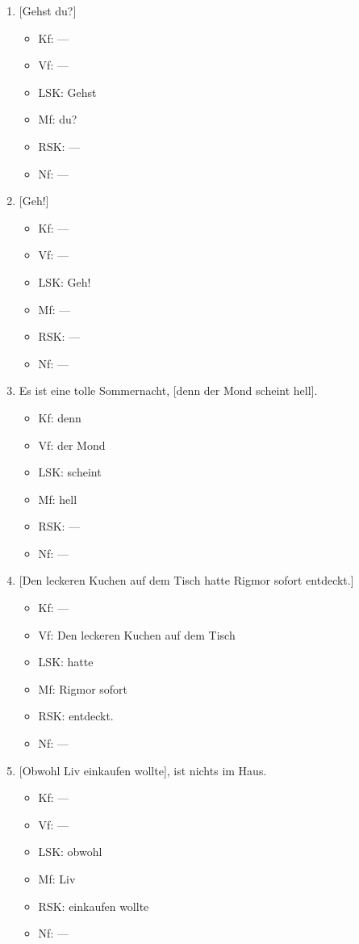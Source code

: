 \begin{enumerate}
\Np

  \item{} [Gehst du?]
    \begin{itemize}
      \item Kf: ---
      \item Vf: ---
      \item LSK: Gehst
      \item Mf: du?
      \item RSK: ---
      \item Nf: ---
    \end{itemize}
  \item{} [Geh!]
    \begin{itemize}
      \item Kf: ---
      \item Vf: ---
      \item LSK: Geh!
      \item Mf: ---
      \item RSK: ---
      \item Nf: ---
    \end{itemize}
  \item Es ist eine tolle Sommernacht, [denn der Mond scheint hell].
    \begin{itemize}
      \item Kf: denn
      \item Vf: der Mond
      \item LSK: scheint
      \item Mf: hell
      \item RSK: ---
      \item Nf: ---
    \end{itemize}
  \item{} [Den leckeren Kuchen auf dem Tisch hatte Rigmor sofort entdeckt.]
    \begin{itemize}
      \item Kf: ---
      \item Vf: Den leckeren Kuchen auf dem Tisch
      \item LSK: hatte
      \item Mf: Rigmor sofort
      \item RSK: entdeckt.
      \item Nf: ---
    \end{itemize}
  \item{} [Obwohl Liv einkaufen wollte], ist nichts im Haus.
    \begin{itemize}
      \item Kf: ---
      \item Vf: ---
      \item LSK: obwohl
      \item Mf: Liv
      \item RSK: einkaufen wollte
      \item Nf: ---
    \end{itemize}


\end{enumerate}
